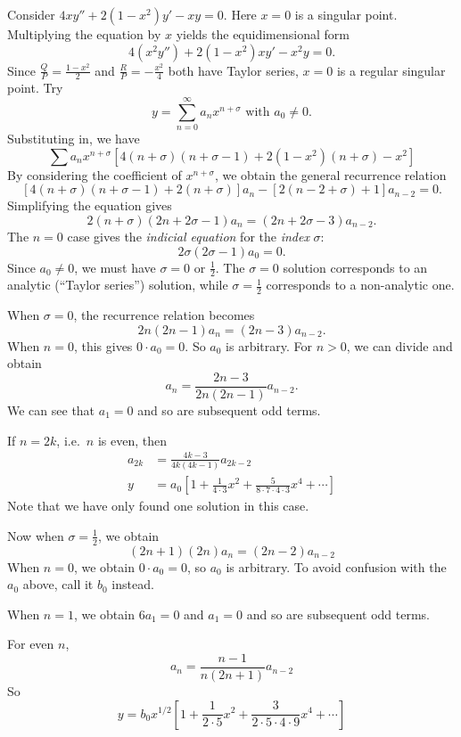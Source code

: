 \documentclass[a4paper]{article}
\begin{document}
\begin{eg}
  Consider $4xy'' + 2(1 - x^2)y' - xy = 0$. Here $x = 0$ is a singular point. Multiplying the equation by $x$ yields the equidimensional form
  \[
    4(x^2 y'') + 2(1 - x^2)xy' - x^2 y = 0.
  \]
  Since $\frac{Q}{P} = \frac{1 - x^2}{2}$ and $\frac{R}{P} = -\frac{x^2}{4}$ both have Taylor series, $x = 0$ is a regular singular point. Try
  \[
    y = \sum_{n = 0}^\infty a_n x^{n + \sigma}\text{ with }a_0 \not= 0.
  \]
  Substituting in, we have
  \[
    \sum a_n x^{n + \sigma}[4(n + \sigma)(n + \sigma - 1) + 2(1 - x^2)(n + \sigma) - x^2]
  \]
  By considering the coefficient of $x^{n + \sigma}$, we obtain the general recurrence relation
  \[
    [4(n + \sigma)(n + \sigma - 1) + 2(n + \sigma)]a_n -[2(n - 2 + \sigma) + 1]a_{n - 2} = 0.
  \]
  Simplifying the equation gives
  \[
    2(n + \sigma)(2n + 2\sigma - 1)a_n = (2n + 2\sigma-3)a_{n - 2}.
  \]
  The $n = 0$ case gives the \emph{indicial equation} for the \emph{index} $\sigma$:
  \[
    2\sigma(2\sigma - 1)a_0 = 0.
  \]
  Since $a_0 \not= 0$, we must have $\sigma = 0$ or $\frac{1}{2}$. The $\sigma = 0$ solution corresponds to an analytic (``Taylor series'') solution, while $\sigma = \frac{1}{2}$ corresponds to a non-analytic one.

  When $\sigma = 0$, the recurrence relation becomes
  \[
    2n(2n - 1)a_n = (2n - 3)a_{n - 2}.
  \]
  When $n = 0$, this gives $0\cdot a_0 = 0$. So $a_0$ is arbitrary. For $n >0$, we can divide and obtain
  \[
    a_n = \frac{2n - 3}{2n(2n - 1)}a_{n - 2}.
  \]
  We can see that $a_1 = 0$ and so are subsequent odd terms.

  If $n = 2k$, i.e.\ $n$ is even, then
  \begin{align*}
    a_{2k} &= \frac{4k - 3}{4k(4k - 1)}a_{2k - 2}\\
    y &= a_0\left[1 + \frac{1}{4\cdot 3}x^2 + \frac{5}{8\cdot 7\cdot 4\cdot 3}x^4 + \cdots\right]
  \end{align*}
  Note that we have only found one solution in this case.

  Now when $\sigma = \frac{1}{2}$, we obtain
  \[
    (2n + 1)(2n)a_n = (2n - 2)a_{n - 2}
  \]
  When $n = 0$, we obtain $0\cdot a_0 = 0$, so $a_0$ is arbitrary. To avoid confusion with the $a_0$ above, call it $b_0$ instead.

  When $n = 1$, we obtain $6a_1 = 0$ and $a_1 = 0$ and so are subsequent odd terms.

  For even $n$,
  \[
    a_n = \frac{n - 1}{n(2n + 1)}a_{n - 2}
  \]
  So
  \[
    y = b_0 x^{1/2}\left[1 + \frac{1}{2\cdot 5}x^2 + \frac{3}{2\cdot 5\cdot 4\cdot 9}x^4 + \cdots\right]
  \]
\end{eg}
\end{document}
